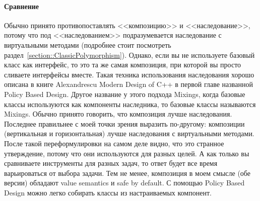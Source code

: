 \paragraph{Сравнение}

Обычно принято противопоставлять <<композицию>> и <<наследование>>, потому что под <<наследованием>> подразумевается наследование с виртуальными методами (подробнее стоит посмотреть раздел~\ref{section::ClassicPolymorphism}).
Однако, если вы не используете базовый класс как интерфейс, то это та же самая композиция, при которой вы просто сливаете интерфейсы вместе.
Такая техника использования наследования хорошо описана в книге Alexandrescu Modern Design of C++ в первой главе названной Policy Based Design.
Другое название у этого подхода Mixings, когда базовые классы используются как компоненты наследника, то базовые классы называются Mixings.
Обычно принято говорить, что композиция лучше наследования.
Последнее правильнее с моей точки зрения выразить по-другому: композиции (вертикальная и горизонтальная) лучше наследования с виртуальными методами.
После такой переформулировки на самом деле видно, что это странное утверждение, потому что они используются для разных целей.
А как только вы сравниваете инструменты для разных задач, то ответ будет все время варьироваться от выбора задачи.
Тем не менее, композиция в моем смысле (обе версии) обладают value semantics и safe by default.
С помощью Policy Based Design можно легко собирать классы из настраиваемых компонент.

